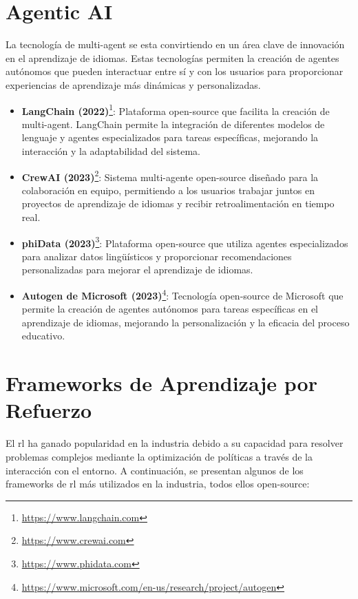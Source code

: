 \section{Agentic AI}

La tecnología de \gls{multi-agent} se esta convirtiendo en un área clave de innovación en el aprendizaje de idiomas. Estas tecnologías permiten la creación de agentes autónomos que pueden interactuar entre sí y con los usuarios para proporcionar experiencias de aprendizaje más dinámicas y personalizadas.

\begin{itemize}
  \item \textbf{LangChain (2022)}\footnote{\url{https://www.langchain.com}}: Plataforma \gls{open-source} que facilita la creación de \gls{multi-agent}. LangChain permite la integración de diferentes modelos de lenguaje y agentes especializados para tareas específicas, mejorando la interacción y la adaptabilidad del sistema.
  \item \textbf{CrewAI (2023)}\footnote{\url{https://www.crewai.com}}: Sistema multi-agente \gls{open-source} diseñado para la colaboración en equipo, permitiendo a los usuarios trabajar juntos en proyectos de aprendizaje de idiomas y recibir retroalimentación en tiempo real.
  \item \textbf{phiData (2023)}\footnote{\url{https://www.phidata.com}}: Plataforma \gls{open-source} que utiliza agentes especializados para analizar datos lingüísticos y proporcionar recomendaciones personalizadas para mejorar el aprendizaje de idiomas.
  \item \textbf{Autogen de Microsoft (2023)}\footnote{\url{https://www.microsoft.com/en-us/research/project/autogen}}: Tecnología \gls{open-source} de Microsoft que permite la creación de agentes autónomos para tareas específicas en el aprendizaje de idiomas, mejorando la personalización y la eficacia del proceso educativo.
\end{itemize}

\section{Frameworks de Aprendizaje por Refuerzo}

El \gls{rl} ha ganado popularidad en la industria debido a su capacidad para resolver problemas complejos mediante la optimización de políticas a través de la interacción con el entorno. A continuación, se presentan algunos de los frameworks de \gls{rl} más utilizados en la industria, todos ellos \gls{open-source}:

